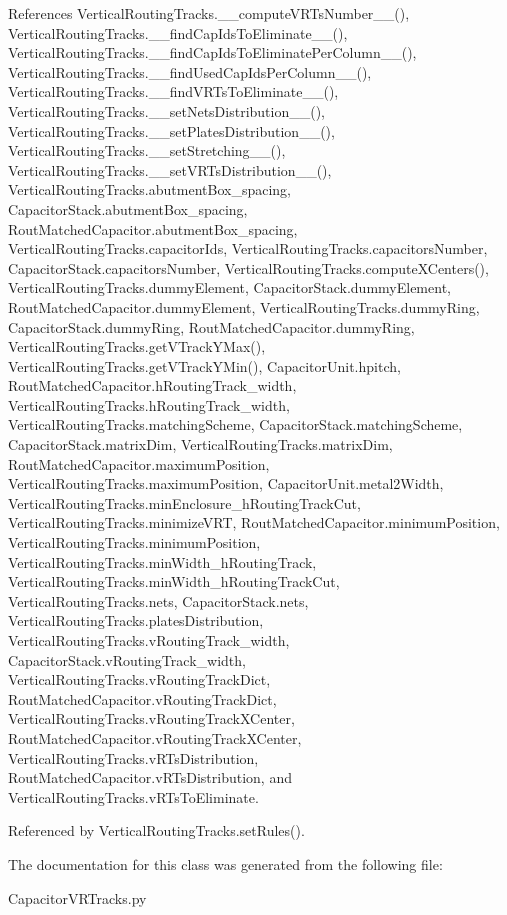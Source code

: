References Vertical\-Routing\-Tracks.\-\_\-\-\_\-compute\-V\-R\-Ts\-Number\-\_\-\-\_\-(), Vertical\-Routing\-Tracks.\-\_\-\-\_\-find\-Cap\-Ids\-To\-Eliminate\-\_\-\-\_\-(), Vertical\-Routing\-Tracks.\-\_\-\-\_\-find\-Cap\-Ids\-To\-Eliminate\-Per\-Column\-\_\-\-\_\-(), Vertical\-Routing\-Tracks.\-\_\-\-\_\-find\-Used\-Cap\-Ids\-Per\-Column\-\_\-\-\_\-(), Vertical\-Routing\-Tracks.\-\_\-\-\_\-find\-V\-R\-Ts\-To\-Eliminate\-\_\-\-\_\-(), Vertical\-Routing\-Tracks.\-\_\-\-\_\-set\-Nets\-Distribution\-\_\-\-\_\-(), Vertical\-Routing\-Tracks.\-\_\-\-\_\-set\-Plates\-Distribution\-\_\-\-\_\-(), Vertical\-Routing\-Tracks.\-\_\-\-\_\-set\-Stretching\-\_\-\-\_\-(), Vertical\-Routing\-Tracks.\-\_\-\-\_\-set\-V\-R\-Ts\-Distribution\-\_\-\-\_\-(), Vertical\-Routing\-Tracks.\-abutment\-Box\-\_\-spacing, Capacitor\-Stack.\-abutment\-Box\-\_\-spacing, Rout\-Matched\-Capacitor.\-abutment\-Box\-\_\-spacing, Vertical\-Routing\-Tracks.\-capacitor\-Ids, Vertical\-Routing\-Tracks.\-capacitors\-Number, Capacitor\-Stack.\-capacitors\-Number, Vertical\-Routing\-Tracks.\-compute\-X\-Centers(), Vertical\-Routing\-Tracks.\-dummy\-Element, Capacitor\-Stack.\-dummy\-Element, Rout\-Matched\-Capacitor.\-dummy\-Element, Vertical\-Routing\-Tracks.\-dummy\-Ring, Capacitor\-Stack.\-dummy\-Ring, Rout\-Matched\-Capacitor.\-dummy\-Ring, Vertical\-Routing\-Tracks.\-get\-V\-Track\-Y\-Max(), Vertical\-Routing\-Tracks.\-get\-V\-Track\-Y\-Min(), Capacitor\-Unit.\-hpitch, Rout\-Matched\-Capacitor.\-h\-Routing\-Track\-\_\-width, Vertical\-Routing\-Tracks.\-h\-Routing\-Track\-\_\-width, Vertical\-Routing\-Tracks.\-matching\-Scheme, Capacitor\-Stack.\-matching\-Scheme, Capacitor\-Stack.\-matrix\-Dim, Vertical\-Routing\-Tracks.\-matrix\-Dim, Rout\-Matched\-Capacitor.\-maximum\-Position, Vertical\-Routing\-Tracks.\-maximum\-Position, Capacitor\-Unit.\-metal2\-Width, Vertical\-Routing\-Tracks.\-min\-Enclosure\-\_\-h\-Routing\-Track\-Cut, Vertical\-Routing\-Tracks.\-minimize\-V\-R\-T, Rout\-Matched\-Capacitor.\-minimum\-Position, Vertical\-Routing\-Tracks.\-minimum\-Position, Vertical\-Routing\-Tracks.\-min\-Width\-\_\-h\-Routing\-Track, Vertical\-Routing\-Tracks.\-min\-Width\-\_\-h\-Routing\-Track\-Cut, Vertical\-Routing\-Tracks.\-nets, Capacitor\-Stack.\-nets, Vertical\-Routing\-Tracks.\-plates\-Distribution, Vertical\-Routing\-Tracks.\-v\-Routing\-Track\-\_\-width, Capacitor\-Stack.\-v\-Routing\-Track\-\_\-width, Vertical\-Routing\-Tracks.\-v\-Routing\-Track\-Dict, Rout\-Matched\-Capacitor.\-v\-Routing\-Track\-Dict, Vertical\-Routing\-Tracks.\-v\-Routing\-Track\-X\-Center, Rout\-Matched\-Capacitor.\-v\-Routing\-Track\-X\-Center, Vertical\-Routing\-Tracks.\-v\-R\-Ts\-Distribution, Rout\-Matched\-Capacitor.\-v\-R\-Ts\-Distribution, and Vertical\-Routing\-Tracks.\-v\-R\-Ts\-To\-Eliminate.



Referenced by Vertical\-Routing\-Tracks.\-set\-Rules().



The documentation for this class was generated from the following file\-:\begin{DoxyCompactItemize}
\item 
Capacitor\-V\-R\-Tracks.\-py\end{DoxyCompactItemize}
